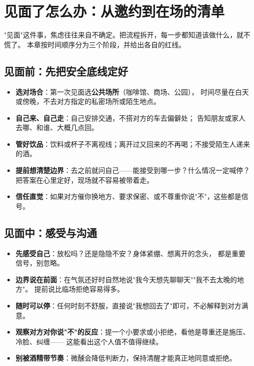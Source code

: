 \documentclass[12pt,UTF8,openany]{ctexbook}
\begin{document}
\tableofcontents
\clearpage
\chapter{见面了怎么办：从邀约到在场的清单}
\label{chap:meeting}

"见面"这件事，焦虑往往来自不确定。把流程拆开，每一步都知道该做什么，就不慌了。
本章按时间顺序分为三个阶段，并给出各自的红线。

\section{见面前：先把安全底线定好}

\begin{itemize}[leftmargin=2em]
  \item \textbf{选对场合}：第一次见面选\textbf{公共场所}（咖啡馆、商场、公园），
        时间尽量在白天或傍晚，不去对方指定的私密场所或陌生地点。
  \item \textbf{自己来、自己走}：自己安排交通，不搭对方的车去偏僻处；
        告知朋友或家人去哪、和谁、大概几点回。
  \item \textbf{管好饮品}：饮料或杯子不离视线；离开过又回来的不再喝；不接受陌生人递来的酒。
  \item \textbf{提前想清楚边界}：去之前就问自己——能接受到哪一步？什么情况一定喊停？
        把答案在心里定好，现场就不容易被带着走。
  \item \textbf{信任直觉}：如果对方催你换地方、要求保密、或不尊重你说"不"，这些都是信号。
\end{itemize}

\section{见面中：感受与沟通}

\begin{itemize}[leftmargin=2em]
  \item \textbf{先感受自己}：放松吗？还是隐隐不安？身体紧绷、想离开的念头，
        都是重要信号，别忽略。
  \item \textbf{边界说在前面}：在气氛还好时自然地说"我今天想先聊聊天""我不去太晚的地方"。
        提前说比临场拒绝容易得多。
  \item \textbf{随时可以停}：任何时刻不舒服，直接说"我想回去了"即可，不必解释到对方满意。
  \item \textbf{观察对方对你说"不"的反应}：提一个小要求或小拒绝，看他是尊重还是施压、冷脸、纠缠——
        这能看出这个人值不值得继续。
  \item \textbf{别被酒精带节奏}：微醺会降低判断力，保持清醒才能真正地同意或拒绝。
\end{itemize}
\end{document}
